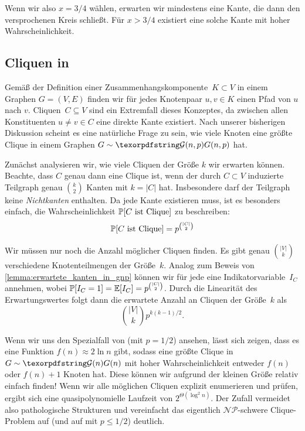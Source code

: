 Wenn wir also $x = 3/4$ wählen, erwarten wir mindestens eine Kante, die dann den versprochenen Kreis schließt.
Für $x > 3/4$ existiert eine solche Kante mit hoher Wahrscheinlichkeit.

\subsection{Cliquen in \Gnp}
Gemäß der Definition einer Zusammenhangskomponente~$K \subset V$ in einem Graphen $G=(V,E)$ finden wir für jedes Knotenpaar $u, v \in K$ einen Pfad von $u$ nach $v$.
Cliquen~$C \subseteq V$ sind ein Extremfall dieses Konzeptes, da zwischen allen Konstituenten $u \ne v \in C$ eine direkte Kante existiert.
Nach unserer bisherigen Diskussion scheint es eine natürliche Frage zu sein, wie viele Knoten eine größte Clique in einem Graphen $G \sim \Gnp$ hat.

Zunächst analysieren wir, wie viele Cliquen der Größe $k$ wir erwarten können.
Beachte, dass $C$ genau dann eine Clique ist, wenn der durch $C \subset V$ induzierte Teilgraph genau $\binom{k}{2}$ Kanten mit $k = |C|$ hat.
Insbesondere darf der Teilgraph keine \emph{Nichtkanten} enthalten.
Da jede Kante existieren muss, ist es besonders einfach, die Wahrscheinlichkeit $\mathbb{P}\!\left[\text{$C$ ist Clique}\right]$ zu beschreiben:
\begin{equation}
    \mathbb{P}\!\left[\text{$C$ ist Clique}\right] = p^{\binom{|C|}{2}}
\end{equation}

Wir müssen nur noch die Anzahl möglicher Cliquen finden.
Es gibt genau $\binom{|V|}{k}$ verschiedene Knotenteilmengen der Größe~$k$.
Analog zum Beweis von \cref{lemma:erwartete_kanten_in_gnp} können wir für jede eine Indikatorvariable~$I_C$ annehmen, wobei $\mathbb{P}\!\left[I_C = 1\right] = \mathbb{E}\!\left[I_C\right] = p^{\smash{\binom{|C|}{2}}}$.
Durch die Linearität des Erwartungswertes folgt dann die erwartete Anzahl an Cliquen der Größe~$k$ als
\begin{equation}
    \binom{|V|}{k} p^{k(k-1)/2}.
\end{equation}

Wenn wir uns den Spezialfall von \Gn (\dh \Gnp mit $p = 1/2$) ansehen, lässt sich zeigen, dass es eine Funktion $f(n) \approx 2\ln n$ gibt,
sodass eine größte Clique in $G \sim \Gn$ mit hoher Wahrscheinlichkeit entweder $f(n)$ oder $f(n)+1$ Knoten hat.
Diese können wir aufgrund der kleinen Größe relativ einfach finden!
Wenn wir alle möglichen Cliquen explizit enumerieren und prüfen, ergibt sich  eine quasipolynomielle Laufzeit von $2^{\Theta(\log^2 n)}$.
Der Zufall vermeidet also pathologische Strukturen und vereinfacht das eigentlich $\mathcal{NP}$-schwere Clique-Problem auf \Gn (und auf \Gnp mit $p \le 1/2$) deutlich.